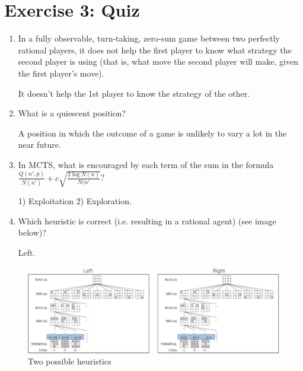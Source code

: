 \documentclass[9pt,a4paper]{extarticle}
\newenvironment{solution}
    {%
    \color{red}
    }
    { 
    \color{black}
    }
\begin{document}
\section*{Exercise 3: Quiz}
   \begin{enumerate}
       \item In a fully observable, turn-taking, zero-sum game between two perfectly rational players, it does not help the first player to know what strategy the second player is using (that is, what move the second player will make, given the first player’s move).
       \begin{solution}
       It doesn't help the 1st player to know the strategy of the other.
       \end{solution}
       \item What is a quiescent position?
       \begin{solution}
       A position in which the outcome of a game is unlikely to vary a lot in the near future.
       \end{solution}
       \item In MCTS, what is encouraged by each term of the sum in the formula $\frac{Q(n', p)}{N(n')} + c\sqrt{\frac{2\log N(n)}{N(n'}}$?
       \begin{solution}
       1) Exploitation 2) Exploration.
       \end{solution}
       \item Which heuristic is correct (i.e. resulting in a rational agent) (see image below)?
       \begin{solution}
       Left.
       \end{solution}
   \end{enumerate}
   \begin{figure}[H]
       \centering
       \includegraphics[width=1.\textwidth]{figures/trees.pdf}
       \caption{Two possible heuristics}
       \label{fig:my_label}
   \end{figure}
\end{document}
